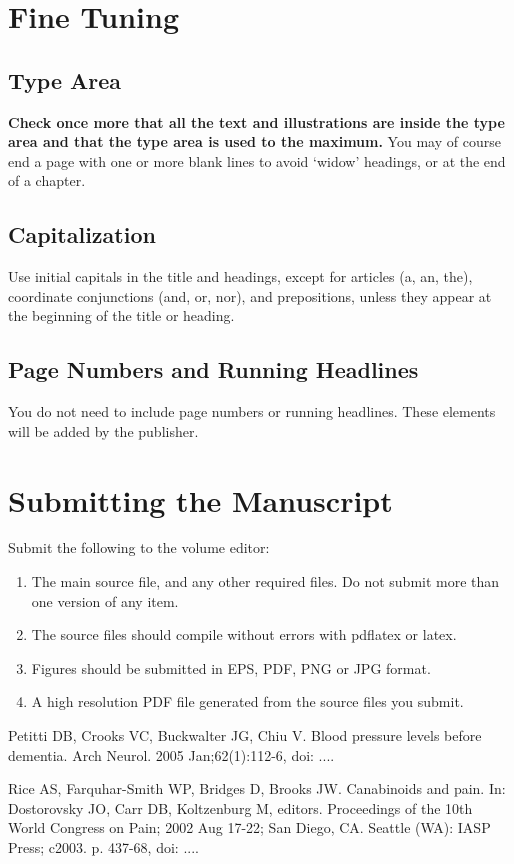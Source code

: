 \documentclass{IOS-Book-Article}
\begin{document}
\section{Fine Tuning}

\subsection{Type Area}
\textbf{Check once more that all the text and illustrations are inside the type area and
that the type area is used to the maximum.} You may of course end a page with one
or more blank lines to avoid `widow' headings, or at the end of a chapter.

\subsection{Capitalization}
Use initial capitals in the title and headings, except for articles (a, an, the), coordinate
conjunctions (and, or, nor), and prepositions, unless they appear at the beginning of the
title or heading.

\subsection{Page Numbers and Running Headlines}
You do not need to include page numbers or running headlines. These elements will be
added by the publisher.

\section{Submitting the Manuscript}
Submit the following to the volume editor:

\begin{enumerate}
\item The main source file, and any other required files. Do not submit more than
one version of any item.

\item The source files should compile without errors with pdflatex or latex.

\item Figures should be submitted in EPS, PDF, PNG or JPG format.

\item A high resolution PDF file generated from the source files you submit.
\end{enumerate}

\begin{thebibliography}{99}


Petitti DB, Crooks VC, Buckwalter JG, Chiu V. Blood pressure levels before dementia.
Arch Neurol. 2005 Jan;62(1):112-6, doi: ....

Rice AS, Farquhar-Smith WP, Bridges D, Brooks JW. Canabinoids and pain. In: Dostorovsky JO,
Carr DB, Koltzenburg M, editors. Proceedings of the 10th World Congress on Pain;  2002 Aug
17-22; San Diego, CA. Seattle (WA): IASP Press; c2003. p. 437-68, doi: ....

\end{thebibliography}
\end{document}

